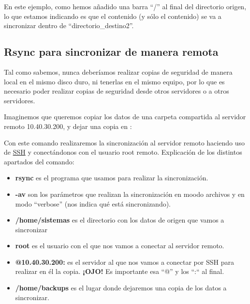 En este ejemplo, como hemos añadido una barra “/” al final del directorio origen, lo que estamos indicando es que el contenido (y sólo el contenido) se va a sincronizar dentro de “directorio\_destino2”.


\subsection{Rsync para sincronizar de manera remota}
Tal como sabemos, nunca deberíamos realizar copias de seguridad de manera local en el mismo disco duro, ni tenerlas en el mismo equipo, por lo que es necesario poder realizar copias de seguridad desde otros servidores o a otros servidores.

Imaginemos que queremos copiar los datos de una carpeta compartida  al servidor remoto 10.40.30.200, y dejar una copia en :


Con este comando realizaremos la sincronización al servidor remoto haciendo uso de \hyperlink{ssh_server}{SSH} y conectándonos con el usuario root remoto. Explicación de los distintos apartados del comando:
\begin{itemize}
    \item \textbf{rsync} es el programa que usamos para realizar la sincronización.
    \item \textbf{-av} son los parámetros que realizan la sincronización en moodo archivos y en modo “verbose” (nos indica qué está sincronizando).
    \item \textbf{/home/sistemas} es el directorio con los datos de origen que vamos a sincronizar
    \item \textbf{root} es el usuario con el que nos vamos a conectar al servidor remoto.
    \item \textbf{@10.40.30.200:} es el servidor al que nos vamos a conectar por SSH para realizar en él la copia. \textbf{¡OJO!} Es importante esa “@” y los “:“ al final.
    \item \textbf{/home/backups} es el lugar donde dejaremos una copia de los datos a sincronizar.
\end{itemize}

